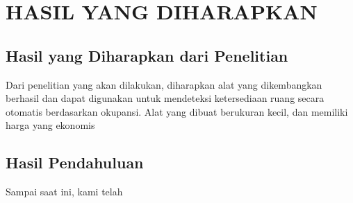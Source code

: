 \chapter{HASIL YANG DIHARAPKAN}

\section{Hasil yang Diharapkan dari Penelitian}

Dari penelitian yang akan dilakukan, diharapkan alat yang dikembangkan berhasil dan dapat digunakan untuk mendeteksi ketersediaan ruang secara otomatis berdasarkan okupansi. 
Alat yang dibuat berukuran kecil, dan memiliki harga yang ekonomis


\section{Hasil Pendahuluan}

Sampai saat ini, kami telah \lipsum[16]
